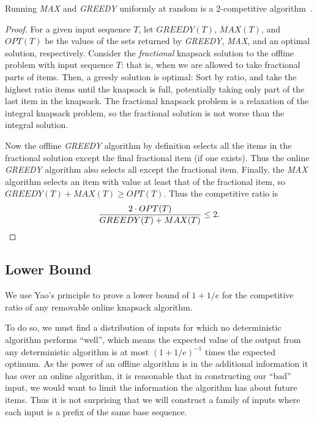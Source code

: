 \begin{theorem}
	Running \emph{MAX} and \emph{GREEDY} uniformly at random is a 2-competitive algorithm~\cite{han}.
\end{theorem}
\begin{proof}
	For a given input sequence $T$, let $GREEDY(T)$, $MAX(T)$, and $OPT(T)$ be the values of the sets returned by \emph{GREEDY}, \emph{MAX}, and an optimal solution, respectively. Consider the \emph{fractional} knapsack solution to the offline problem with input sequence $T$: that is, when we are allowed to take fractional parts of items. Then, a greedy solution is optimal: Sort by ratio, and take the highest ratio items until the knapsack is full, potentially taking only part of the last item in the knapsack. The fractional knapsack problem is a relaxation of the integral knapsack problem, so the fractional solution is not worse than the integral solution.
	
	Now the offline \emph{GREEDY} algorithm by definition selects all the items in the fractional solution except the final fractional item (if one exists). Thus the online \emph{GREEDY} algorithm also selects all except the fractional item. Finally, the \emph{MAX} algorithm selects an item with value at least that of the fractional item, so $GREEDY(T)+MAX(T) \ge OPT(T)$. Thus the competitive ratio is
\begin{equation*}
\frac{2\cdot OPT(T)}{GREEDY(T)+MAX(T)} \le 2.\qedhere
\end{equation*}
\end{proof}

\subsection{Lower Bound}
We use Yao's principle to prove a lower bound of $1+1/e$ for the competitive ratio of any removable online knapsack algorithm.

To do so, we must find a distribution of inputs for which no deterministic algorithm performs ``well'', which means the expected value of the output from any deterministic algorithm is at most $(1+1/e)^{-1}$ times the expected optimum. As the power of an offline algorithm is in the additional information it has over an online algorithm, it is reasonable that in constructing our ``bad'' input, we would want to limit the information the algorithm has about future items. Thus it is not surprising that we will construct a family of inputs where each input is a prefix of the same base sequence.


